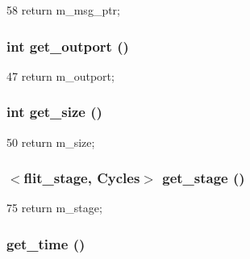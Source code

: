 \begin{DoxyCode}
58 { return m_msg_ptr; }
\end{DoxyCode}
\hypertarget{classflit__d_a47a477d5bcd6a5d32aa4028e103f06ca}{
\subsubsection[{get\_\-outport}]{\setlength{\rightskip}{0pt plus 5cm}int get\_\-outport ()}}
\label{classflit__d_a47a477d5bcd6a5d32aa4028e103f06ca}



\begin{DoxyCode}
47 {return m_outport; }
\end{DoxyCode}
\hypertarget{classflit__d_a885808baa3d930eac7a825f7d49f73d7}{
\subsubsection[{get\_\-size}]{\setlength{\rightskip}{0pt plus 5cm}int get\_\-size ()}}
\label{classflit__d_a885808baa3d930eac7a825f7d49f73d7}



\begin{DoxyCode}
50 { return m_size; }
\end{DoxyCode}
\hypertarget{classflit__d_a741022810b1515cb347e4d075ff4e731}{
\subsubsection[{get\_\-stage}]{$<${\bf flit\_\-stage}, {\bf Cycles}$>$ get\_\-stage ()}}
\label{classflit__d_a741022810b1515cb347e4d075ff4e731}



\begin{DoxyCode}
75 { return m_stage; }
\end{DoxyCode}
\hypertarget{classflit__d_a92a32b4bfae6e08f31ab344b857eb8c3}{
\subsubsection[{get\_\-time}]{ get\_\-time ()}}
\label{classflit__d_a92a32b4bfae6e08f31ab344b857eb8c3}



